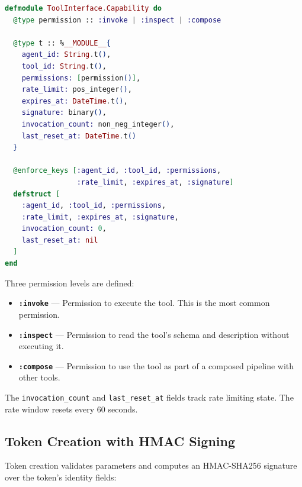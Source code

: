 \documentclass[12pt,a4paper]{article}
\theoremstyle{plain}
\theoremstyle{definition}
\begin{document}
\begin{lstlisting}[language=elixir, caption={Capability token struct definition.}, label={lst:cap-struct}]
defmodule ToolInterface.Capability do
  @type permission :: :invoke | :inspect | :compose

  @type t :: %__MODULE__{
    agent_id: String.t(),
    tool_id: String.t(),
    permissions: [permission()],
    rate_limit: pos_integer(),
    expires_at: DateTime.t(),
    signature: binary(),
    invocation_count: non_neg_integer(),
    last_reset_at: DateTime.t()
  }

  @enforce_keys [:agent_id, :tool_id, :permissions,
                 :rate_limit, :expires_at, :signature]
  defstruct [
    :agent_id, :tool_id, :permissions,
    :rate_limit, :expires_at, :signature,
    invocation_count: 0,
    last_reset_at: nil
  ]
end
\end{lstlisting}

Three permission levels are defined:

\begin{itemize}[leftmargin=2em]
\item \textbf{\texttt{:invoke}} --- Permission to execute the tool. This is the most common permission.
\item \textbf{\texttt{:inspect}} --- Permission to read the tool's schema and description without executing it.
\item \textbf{\texttt{:compose}} --- Permission to use the tool as part of a composed pipeline with other tools.
\end{itemize}

The \texttt{invocation\_count} and \texttt{last\_reset\_at} fields track rate limiting state. The rate window resets every 60 seconds.

\subsection{Token Creation with HMAC Signing}

Token creation validates parameters and computes an HMAC-SHA256 signature over the token's identity fields:
\end{document}
